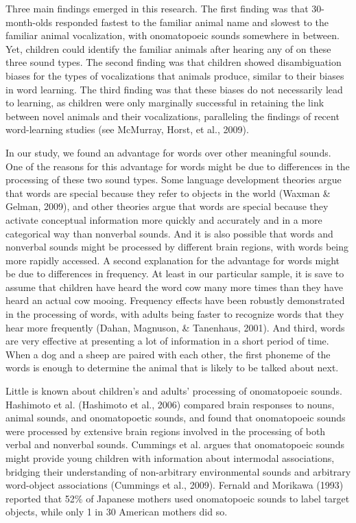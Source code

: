 \documentclass[english,floatsintext,man]{apa6}
\theoremstyle{definition}
\theoremstyle{definition}
\theoremstyle{definition}
\theoremstyle{remark}
\begin{document}
Three main findings emerged in this research. The first finding was that
30-month-olds responded fastest to the familiar animal name and slowest
to the familiar animal vocalization, with onomatopoeic sounds somewhere
in between. Yet, children could identify the familiar animals after
hearing any of on these three sound types. The second finding was that
children showed disambiguation biases for the types of vocalizations
that animals produce, similar to their biases in word learning. The
third finding was that these biases do not necessarily lead to learning,
as children were only marginally successful in retaining the link
between novel animals and their vocalizations, paralleling the findings
of recent word-learning studies (see McMurray, Horst, et al., 2009).

In our study, we found an advantage for words over other meaningful
sounds. One of the reasons for this advantage for words might be due to
differences in the processing of these two sound types. Some language
development theories argue that words are special because they refer to
objects in the world (Waxman \& Gelman, 2009), and other theories argue
that words are special because they activate conceptual information more
quickly and accurately and in a more categorical way than nonverbal
sounds. And it is also possible that words and nonverbal sounds might be
processed by different brain regions, with words being more rapidly
accessed. A second explanation for the advantage for words might be due
to differences in frequency. At least in our particular sample, it is
save to assume that children have heard the word cow many more times
than they have heard an actual cow mooing. Frequency effects have been
robustly demonstrated in the processing of words, with adults being
faster to recognize words that they hear more frequently (Dahan,
Magnuson, \& Tanenhaus, 2001). And third, words are very effective at
presenting a lot of information in a short period of time. When a dog
and a sheep are paired with each other, the first phoneme of the words
is enough to determine the animal that is likely to be talked about
next.

Little is known about children's and adults' processing of onomatopoeic
sounds. Hashimoto et al. (Hashimoto et al., 2006) compared brain
responses to nouns, animal sounds, and onomatopoetic sounds, and found
that onomatopoeic sounds were processed by extensive brain regions
involved in the processing of both verbal and nonverbal sounds. Cummings
et al. argues that onomatopoeic sounds might provide young children with
information about intermodal associations, bridging their understanding
of non-arbitrary environmental sounds and arbitrary word-object
associations (Cummings et al., 2009). Fernald and Morikawa (1993)
reported that 52\% of Japanese mothers used onomatopoeic sounds to label
target objects, while only 1 in 30 American mothers did so.
\end{document}
